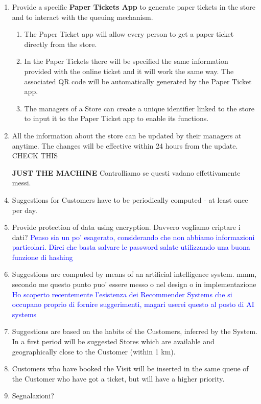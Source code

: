 \documentclass[a4paper, 10pt, oneside]{article}
\newcommand*{\lorenzo}[1]{\textcolor{BurntOrange}{#1}}
\newcommand{\giovanni}[1]{\textcolor{Blue}{#1}}
\begin{document}
\begin{enumerate}[align=left]
    \item Provide a specific \textbf{Paper Tickets App} to generate paper tickets in the store and to interact with the queuing mechanism.
    \begin{enumerate}[label={-}]
        \item The Paper Ticket app will allow every person to get a paper ticket directly from the store.
        \item In the Paper Tickets there will be specified the same information provided with the online ticket and it will work the same way. The associated QR code will be automatically generated by the Paper Ticket app.
        \item The managers of a Store can create a unique identifier linked to the store to input it to the Paper Ticket app to enable its functions.
    \end{enumerate}
    
    \item All the information about the store can be updated by their managers at anytime. The changes will be effective within 24 hours from the update. \lorenzo{CHECK THIS}
    
    \item[\textbf{JUST THE MACHINE}] \lorenzo{Controlliamo se questi vadano effettivamente messi.}
    \item Suggestions for Customers have to be periodically computed - at least once per day.
    \item Provide protection of data using encryption. \lorenzo{Davvero vogliamo criptare i dati?} \giovanni {Penso sia un po' esagerato, considerando che non abbiamo informazioni particolari. Direi che basta salvare le password salate utilizzando una buona funzione di hashing}
    \item Suggestions are computed by means of an artificial intelligence system. \lorenzo{mmm, secondo me questo punto puo' essere messo o nel design o in implementazione} \giovanni{Ho scoperto recentemente l'esistenza dei Recommender Systems che si occupano proprio di fornire suggerimenti, magari userei questo al posto di AI systems}
    \item Suggestions are based on the habits of the Customers, inferred by the System. In a first period will be suggested Stores which are available and geographically close to the Customer (within 1 km).
    
    \item Customers who have booked  the Visit will be inserted in the same queue of the Customer who have got a ticket, but will have a higher priority.
    
    
    \item \lorenzo{Segnalazioni?}
\end{enumerate}
\end{document}
